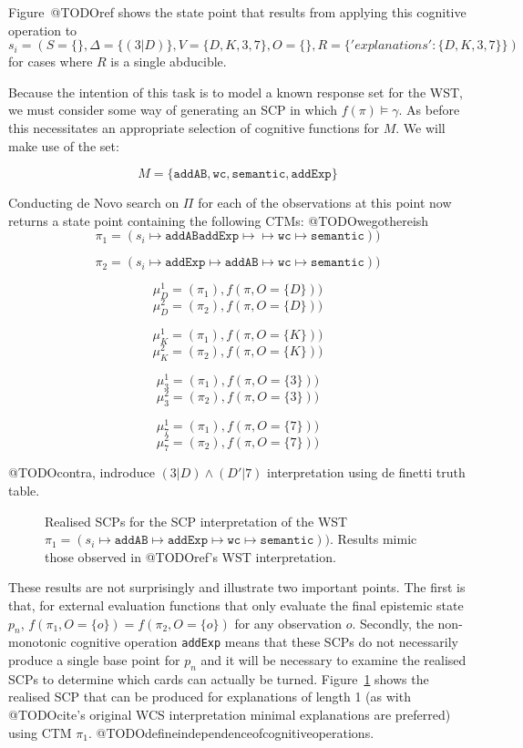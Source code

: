 Figure~@TODOref shows the state point that results from applying this cognitive operation to $s_i=(S=\{\},\Delta=\{(3|D)\},V=\{D,K,3,7\},O=\{\},R=\{'explanations':\{D,K,3,7\}\})$ for cases where $R$ is a single abducible.

Because the intention of this task is to model a known response set for the WST, we must consider some way of generating an SCP in which $f(\pi)\models \gamma$. As before this necessitates an appropriate selection of cognitive functions for $M$. We will make use of the set:

\[
M=\{\texttt{addAB},\texttt{wc},\texttt{semantic}, \texttt{addExp}\}
\]

Conducting de Novo search on $\Pi$ for each of the observations at this point now returns a state point containing the following CTMs:
@TODOwegothereish
\[
\pi_1=(s_i \longmapsto \texttt{addAB} \texttt{addExp} \longmapsto \longmapsto \texttt{wc} \longmapsto \texttt{semantic}))
\]

\[
\pi_2=(s_i \longmapsto \texttt{addExp} \longmapsto \texttt{addAB} \longmapsto \texttt{wc} \longmapsto \texttt{semantic}))
\]


\[
\mu_D^1=(\pi_1), f(\pi, O=\{D\}))
\]
\[
\mu_D^2=(\pi_2), f(\pi, O=\{D\}))
\]

\[
\mu_K^1=(\pi_1), f(\pi, O=\{K\}))
\]
\[
\mu_K^2=(\pi_2), f(\pi, O=\{K\}))
\]

\[
\mu_3^1=(\pi_1), f(\pi, O=\{3\}))
\]
\[
\mu_3^2=(\pi_2), f(\pi, O=\{3\}))
\]

\[
\mu_7^1=(\pi_1), f(\pi, O=\{7\}))
\]
\[
\mu_7^2=(\pi_2), f(\pi, O=\{7\}))
\]

@TODOcontra, indroduce $(3|D) \land (D' | 7 )$ interpretation using de finetti truth table.

\begin{figure}
\label{fig:rSCP_WST}
\caption{Realised SCPs for the SCP interpretation of the WST $\pi_1=(s_i \longmapsto \texttt{addAB} \longmapsto \texttt{addExp}  \longmapsto \texttt{wc} \longmapsto \texttt{semantic}))$. Results mimic those observed in @TODOref's WST interpretation.}
\end{figure}

These results are not surprisingly and illustrate two important points. The first is that, for external evaluation functions that only evaluate the final epistemic state $p_n$, $f(\pi_1,O=\{o\})=f(\pi_2,O=\{o\})$ for any observation $o$. Secondly, the non-monotonic cognitive operation \texttt{addExp} means that these SCPs do not necessarily produce a single base point for $p_n$ and it will be necessary to examine the realised SCPs to determine which cards can actually be turned. Figure~\ref{fig:rSCP_WST} shows the realised SCP that can be produced for explanations of length 1 (as with @TODOcite's original WCS interpretation minimal explanations are preferred) using CTM $\pi_1$. @TODOdefineindependenceofcognitiveoperations. 

